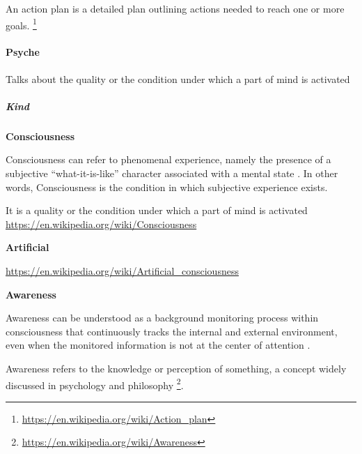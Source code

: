 \documentclass{book}
\providecommand{\ProjectDeepHeading}[2]{%
    \par\medskip\noindent\textbf{#2}\par\smallskip
}
\providecommand{\seeherefooter}[1]{\footnote{\url{#1}}}
\begin{document}
      An action plan is a detailed plan outlining actions needed to reach one or more goals. \seeherefooter{https://en.wikipedia.org/wiki/Action_plan}

\paragraph{Psyche}


Talks about the quality or the condition under which a part of mind is activated

\subparagraph{Kind}

\ProjectDeepHeading{1}{Consciousness}


Consciousness can refer to phenomenal experience, namely the presence of a subjective ``what-it-is-like'' character associated with a mental state \cite{block-1995-on-a-confusion-about-a-function-of-consciousness}. In other words, Consciousness is the condition in which subjective experience exists.
    
    It is a quality or the condition under which a part of mind is activated
    \url{https://en.wikipedia.org/wiki/Consciousness}

\ProjectDeepHeading{2}{Artificial}


\url{https://en.wikipedia.org/wiki/Artificial_consciousness}

\ProjectDeepHeading{2}{Awareness}


Awareness can be understood as a background monitoring process within consciousness that continuously tracks the internal and external environment, even when the monitored information is not at the center of attention \cite{brown-2003-the-benefits-of-being-present-mindfulness-and-its-role-in-psychological-well-being}.
    
    Awareness refers to the knowledge or perception of something, a concept widely discussed in psychology and philosophy \seeherefooter{https://en.wikipedia.org/wiki/Awareness}.
\end{document}
